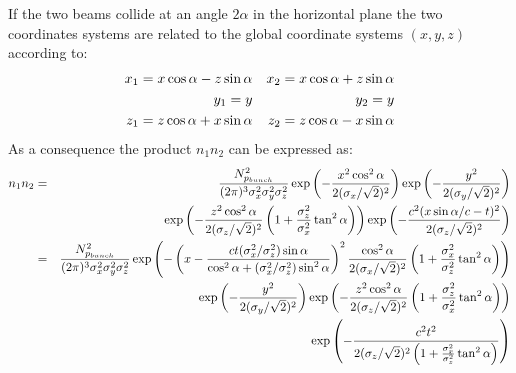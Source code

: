 \documentclass[10pt]{article}
\begin{document}
If the two beams collide at an angle $2\alpha$ in the horizontal plane the two coordinates systems are related to the global coordinate systems $(x,y,z)$ according to:
\begin{eqnarray}
x_1 = x\cos\alpha - z\sin\alpha && x_2 = x\cos\alpha + z \sin\alpha\cr
y_1 = y && y_2 = y\cr
z_1 = z\cos\alpha + x\sin\alpha && z_2 = z\cos\alpha - x \sin\alpha
\end{eqnarray}
As a consequence the product $n_1n_2$ can be expressed as:
\begin{eqnarray}
n_1n_2&=&\frac{N^2_{p_{bunch}}}{(2\pi)^3\sigma_x^2\sigma_y^2\sigma_z^2}\exp\left({-\frac{x^2\cos^2\alpha}{2(\sigma_x/\sqrt{2})^2}}\right)
\exp\left({-\frac{y^2}{2(\sigma_y/\sqrt{2})^2}}\right)\cr
&&\exp\left({-\frac{z^2\cos^2\alpha}{2(\sigma_z/\sqrt{2})^2}\left(1+\frac{\sigma^2_z}{\sigma^2_x}\tan^2\alpha\right)}\right)
\exp\left({-\frac{c^2(x\sin\alpha/c-t)^2}{2(\sigma_z/\sqrt{2})^2}}\right)\\
&=&\frac{N^2_{p_{bunch}}}{(2\pi)^3\sigma_x^2\sigma_y^2\sigma_z^2}\exp\left({-\left(x-\frac{ct(\sigma^2_x/\sigma^2_z)\sin\alpha}{\cos^2\alpha+(\sigma^2_x/\sigma^2_z)\sin^2\alpha}\right)^2\frac{\cos^2\alpha}{2(\sigma_x/\sqrt{2})^2}\left(1+\frac{\sigma^2_x}{\sigma^2_z}\tan^2\alpha\right)}\right)\cr
&&\exp\left({-\frac{y^2}{2(\sigma_y/\sqrt{2})^2}}\right)\exp\left({-\frac{z^2\cos^2\alpha}{2(\sigma_z/\sqrt{2})^2}\left(1+\frac{\sigma^2_z}{\sigma^2_x}\tan^2\alpha\right)}\right)\cr
&&\exp\left({-\frac{c^2t^2}{2(\sigma_z/\sqrt{2})^2\left(1+\frac{\sigma^2_x}{\sigma^2_z}\tan^2\alpha\right)}}\right)
\end{eqnarray}
%
\end{document}
